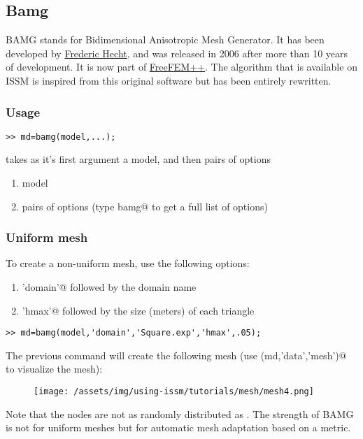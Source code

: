 \subsection{Bamg}%
BAMG stands for Bidimensional Anisotropic Mesh Generator. It has been developed by \href{http://www.ann.jussieu.fr/hecht/}{Frederic Hecht}, and was released in 2006 after more than 10 years of development. It is now part of \href{http://www.freefem.org/ff++/}{FreeFEM++}. The algorithm that is available on ISSM is inspired from this original software but has been entirely rewritten.
\subsubsection{Usage}%
\begin{verbatim}>> md=bamg(model,...);\end{verbatim}
\verb@bamg@ takes as it's first argument a model, and then pairs of options
\begin{enumerate}
	\item model
	\item pairs of options (type \verb@help bamg@ to get a full list of options)
\end{enumerate}
\subsubsection{Uniform mesh}%
To create a non-uniform mesh, use the following options:
\begin{enumerate}
	\item \verb@'domain'@ followed by the domain name
	\item \verb@'hmax'@ followed by the size (meters) of each triangle
\end{enumerate}
\begin{verbatim}>> md=bamg(model,'domain','Square.exp','hmax',.05);\end{verbatim}
The previous command will create the following mesh (use \verb@plotmodel(md,'data','mesh')@ to visualize the mesh):
\begin{figure}[H]
	\begin{center}
		\texttt{[image: /assets/img/using-issm/tutorials/mesh/mesh4.png]}
	\end{center}
\end{figure}
Note that the nodes are not as randomly distributed as \verb@triangle@. The strength of BAMG is not for uniform meshes but for automatic mesh adaptation based on a metric.
